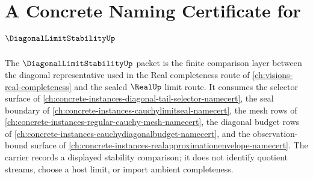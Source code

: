 \chapter{A Concrete Naming Certificate for $\DiagonalLimitStabilityUp$}
\label{ch:concrete-instances-diagonal-limit-stability-namecert}

The $\DiagonalLimitStabilityUp$ packet is the finite comparison layer between the diagonal representative used in the Real completeness route of \autoref{ch:visions-real-completeness} and the sealed $\RealUp$ limit route. It consumes the selector surface of \autoref{ch:concrete-instances-diagonal-tail-selector-namecert}, the seal boundary of \autoref{ch:concrete-instances-cauchylimitseal-namecert}, the mesh rows of \autoref{ch:concrete-instances-regular-cauchy-mesh-namecert}, the diagonal budget rows of \autoref{ch:concrete-instances-cauchydiagonalbudget-namecert}, and the observation-bound surface of \autoref{ch:concrete-instances-realapproximationenvelope-namecert}. The carrier records a displayed stability comparison; it does not identify quotient streams, choose a host limit, or import ambient completeness.



